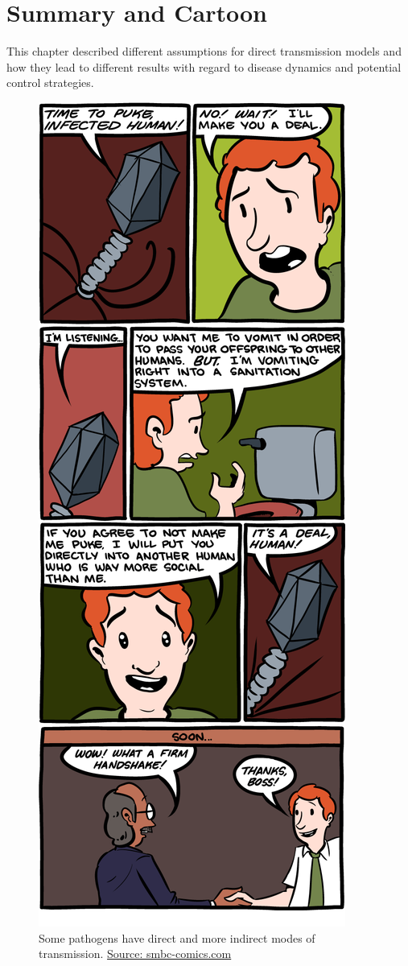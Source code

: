 \documentclass[]{book}
\theoremstyle{definition}
\theoremstyle{definition}
\theoremstyle{definition}
\theoremstyle{remark}
\begin{document}
\section{Summary and Cartoon}\label{summary-and-cartoon-5}

This chapter described different assumptions for direct transmission
models and how they lead to different results with regard to disease
dynamics and potential control strategies.

\begin{figure}
\centering
\includegraphics{./images/smbctransmissionmode.png}
\caption{Some pathogens have direct and more indirect modes of
transmission. \href{http://www.smbc-comics.com/}{Source:
smbc-comics.com}}
\end{figure}
\end{document}

